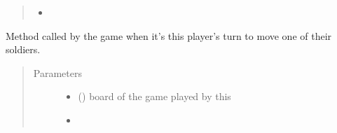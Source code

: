 \documentclass[letterpaper,10pt,english]{sphinxmanual}
\begin{document}
\begin{fulllineitems}
\begin{fulllineitems}
\begin{quote}
\begin{description}
\begin{itemize}
\item {} 
 \textendash{} 

\end{itemize}

\end{description}\end{quote}

\end{fulllineitems}


\begin{fulllineitems}
\label{\detokenize{player:player.Player.move_soldier}}
Method called by the game when it’s this player’s turn to move one of
their soldiers.
\begin{quote}\begin{description}
\item[{Parameters}] \leavevmode\begin{itemize}
\item {} 
 ({\hyperref[\detokenize{neutron:neutron.NeutronBoard}]{}}) \textendash{} board of the game played by this

\item {} 
 \textendash{} 

\end{itemize}

\end{description}\end{quote}

\end{fulllineitems}


\end{fulllineitems}

\end{document}
